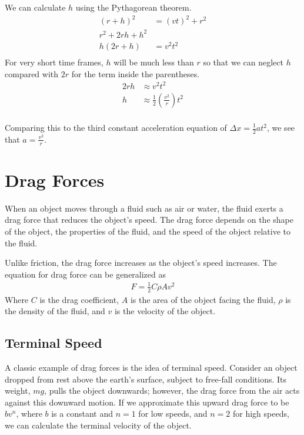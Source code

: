 \documentclass[11pt]{article}
\begin{document}
We can calculate $h$ using the Pythagorean theorem.
\begin{align*}
    (r + h)^2 &= (vt)^2 + r^2 \\
    r^2 + 2rh + h^2 \\
    h(2r + h) &= v^2 t^2\\
\end{align*}
For very short time frames, $h$ will be much less than $r$ so that we can neglect $h$ compared with $2r$ for the term inside the parentheses.
\begin{align*}
    2rh &\approx v^2 t^2 \\
    h &\approx \frac{1}{2}\left(\frac{v^2}{r}\right)t^2 \\
\end{align*}

Comparing this to the third constant acceleration equation of $\Delta x = \frac{1}{2}at^2$, we see that $a = \frac{v^2}{r}$.

\section{Drag Forces}

When an object moves through a fluid such as air or water, the fluid exerts a drag force that reduces the object's speed. The drag force depends on the shape of the object, the properties of the fluid, and the speed of the object relative to the fluid. 

Unlike friction, the drag force increases as the object's speed increases. The equation for drag force can be generalized as
\begin{align*}
    F = \frac{1}{2}C\rho Av^2
\end{align*}
Where $C$ is the drag coefficient, $A$ is the area of the object facing the fluid, $\rho$ is the density of the fluid, and $v$ is the velocity of the object.

\subsection{Terminal Speed}

A classic example of drag forces is the idea of terminal speed. Consider an object dropped from rest above the earth's surface, subject to free-fall conditions. Its weight, $mg$, pulls the object downwards; however, the drag force from the air acts against this downward motion. If we approximate this upward drag force to be $bv^n$, where $b$ is a constant and $n = 1$ for low speeds, and $n = 2$ for high speeds, we can calculate the terminal velocity of the object.
\end{document}
